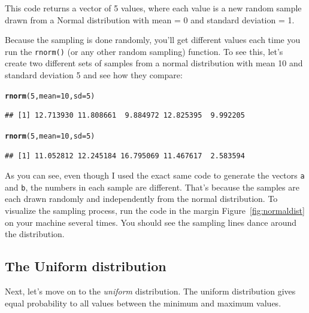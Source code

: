 \documentclass{tufte-book}\usepackage[]{graphicx}\usepackage[]{color}
\makeatletter
\newcommand{\hlnum}[1]{\textcolor[rgb]{0.686,0.059,0.569}{#1}}%
\newcommand{\hlstd}[1]{\textcolor[rgb]{0.345,0.345,0.345}{#1}}%
\newcommand{\hlkwc}[1]{\textcolor[rgb]{0.333,0.667,0.333}{#1}}%
\newcommand{\hlkwd}[1]{\textcolor[rgb]{0.737,0.353,0.396}{\textbf{#1}}}%
\newenvironment{kframe}{%
 \def\at@end@of@kframe{}%
 \ifinner\ifhmode%
  \def\at@end@of@kframe{\end{minipage}}%
  \begin{minipage}{\columnwidth}%
 \fi\fi%
 \def\FrameCommand##1{\hskip\@totalleftmargin \hskip-\fboxsep
 \colorbox{shadecolor}{##1}\hskip-\fboxsep
     \hskip-\linewidth \hskip-\@totalleftmargin \hskip\columnwidth}%
 \MakeFramed {\advance\hsize-\width
   \@totalleftmargin\z@ \linewidth\hsize
   \@setminipage}}%
 {\par\unskip\endMakeFramed%
 \at@end@of@kframe}
\newenvironment{knitrout}{}{} %
\makeatother
\begin{document}
This code returns a vector of 5 values, where each value is a new random sample drawn from a Normal distribution with mean = 0 and standard deviation = 1.

Because the sampling is done randomly, you'll get different values each time you run the \texttt{rnorm()} (or any other random sampling) function. To see this, let's create two different sets of samples from a normal distribution with mean 10 and standard deviation 5 and see how they compare:

\begin{knitrout}
\color{fgcolor}\begin{kframe}
\begin{alltt}
\hlkwd{rnorm}\hlstd{(}\hlnum{5}\hlstd{,} \hlkwc{mean} \hlstd{=} \hlnum{10}\hlstd{,} \hlkwc{sd} \hlstd{=} \hlnum{5}\hlstd{)}
\end{alltt}
\begin{verbatim}
## [1] 12.713930 11.808661  9.884972 12.825395  9.992205
\end{verbatim}
\begin{alltt}
\hlkwd{rnorm}\hlstd{(}\hlnum{5}\hlstd{,} \hlkwc{mean} \hlstd{=} \hlnum{10}\hlstd{,} \hlkwc{sd} \hlstd{=} \hlnum{5}\hlstd{)}
\end{alltt}
\begin{verbatim}
## [1] 11.052812 12.245184 16.795069 11.467617  2.583594
\end{verbatim}
\end{kframe}
\end{knitrout}


As you can see, even though I used the exact same code to generate the vectors \texttt{a} and \texttt{b}, the numbers in each sample are different. That's because the samples are each drawn randomly and independently from the normal distribution. To visualize the sampling process, run the code in the margin Figure~\ref{fig:normaldist} on your machine several times. You should see the sampling lines dance around the distribution.

\subsection{The Uniform distribution}

Next, let's move on to the \textit{uniform} distribution. The uniform distribution gives equal probability to all values between the minimum and maximum values.
\end{document}
